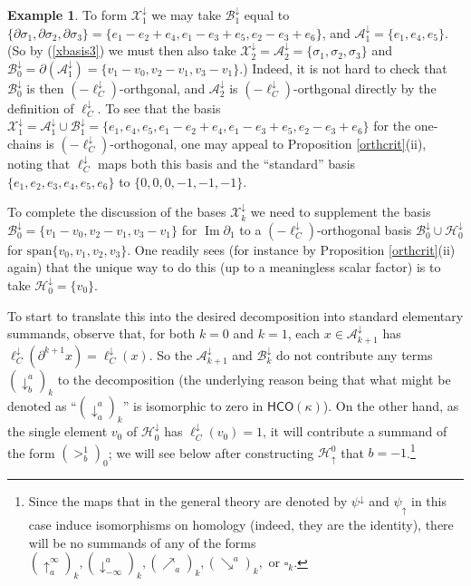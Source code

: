 \documentclass[11pt]{amsart}
\theoremstyle{definition}
\newtheorem{ex}[theorem]{Example}
\theoremstyle{remark}
\numberwithin{equation}{section}
\DeclareMathOperator{\Img}{Im}
\begin{document}
\begin{ex}
To form $\mathcal{X}^{\downarrow}_{1}$ we may take $\mathcal{B}^{\downarrow}_{1}$ equal to $\{\partial \sigma_1,\partial \sigma_2,\partial \sigma_3\}=\{e_1-e_2+e_4,e_1-e_3+e_5,e_2-e_3+e_6\}$, and $\mathcal{A}_{1}^{\downarrow}=\{e_1,e_4,e_5\}$. (So by (\ref{xbasis3}) we must then also take $\mathcal{X}^{\downarrow}_{2}=\mathcal{A}^{\downarrow}_{2}=\{\sigma_1,\sigma_2,\sigma_3\}$ and $\mathcal{B}^{\downarrow}_{0}=\partial\left(\mathcal{A}^{\downarrow}_{1}\right)=\{v_1-v_0,v_2-v_1,v_3-v_1\}$.)  Indeed, it is not hard to check that $\mathcal{B}^{\downarrow}_{0}$ is then $(-\ell^{\downarrow}_{C})$-orthgonal, and $\mathcal{A}^{\downarrow}_{2}$ is   $(-\ell^{\downarrow}_{C})$-orthgonal directly by the definition of $\ell^{\downarrow}_{C}$.  To see that the basis $\mathcal{X}^{\downarrow}_{1}=\mathcal{A}^{\downarrow}_{1}\cup \mathcal{B}^{\downarrow}_{1}=\{e_1,e_4,e_5,e_1-e_2+e_4,e_1-e_3+e_5,e_2-e_3+e_6\}$ for the one-chains is $(-\ell^{\downarrow}_{C})$-orthogonal, one may appeal to  Proposition \ref{orthcrit}(ii), noting that $\ell^{\downarrow}_{C}$ maps both this basis and the ``standard'' basis $\{e_1,e_2,e_3,e_4,e_5,e_6\}$ to $\{0,0,0,-1,-1,-1\}$.  

To complete the discussion of the bases $\mathcal{X}^{\downarrow}_{k}$ we need to supplement the basis $\mathcal{B}^{\downarrow}_{0}=\{v_1-v_0,v_2-v_1,v_3-v_1\}$ for $\Img\partial_1$ to a $(-\ell^{\downarrow}_{C})$-orthogonal basis $\mathcal{B}^{\downarrow}_{0}\cup \mathcal{H}^{\downarrow}_{0}$ for $\mathrm{span}\{v_0,v_1,v_2,v_3\}$.  One readily sees (for instance by Proposition \ref{orthcrit}(ii) again)  that the unique way to do this (up to a meaningless scalar factor) is to take $\mathcal{H}^{\downarrow}_{0}=\{v_0\}$.

To start to translate this into the desired decomposition into standard elementary summands, observe that, for both $k=0$ and $k=1$, each
 $x\in\mathcal{A}^{\downarrow}_{k+1}$ has $\ell^{\downarrow}_{C}(\partial^{k+1}x)=\ell^{\downarrow}_{C}(x)$.  So the $\mathcal{A}^{\downarrow}_{k+1}$ and $\mathcal{B}^{\downarrow}_{k}$ do not contribute any terms $(\downarrow_{b}^{a})_k$ to the decomposition 
(the underlying reason being that what might be denoted as ``$(\downarrow_{a}^{a})_k$'' is isomorphic to zero in $\mathsf{HCO}(\kappa)$).  On the other hand, as the single element $v_0$ of $\mathcal{H}_{0}^{\downarrow}$ has $\ell^{\downarrow}_{C}(v_0)=1$, it will contribute a summand of the form $(>^{1}_{b})_0$; we will see below after constructing $\mathcal{H}_{\uparrow}^{0}$ that $b=-1$.\footnote{Since the maps that in the general
 theory are denoted by $\psi^{\downarrow}$ and $\psi_{\uparrow}$ in this case induce isomorphisms on homology (indeed, they are the identity), there will be no summands of any of the forms $(\uparrow_{a}^{\infty})_k,(\downarrow^{a}_{-\infty})_k,(\nearrow_a)_k,(\searrow^a)_k,$ or $\square_k$.}


\end{ex}
\end{document}
